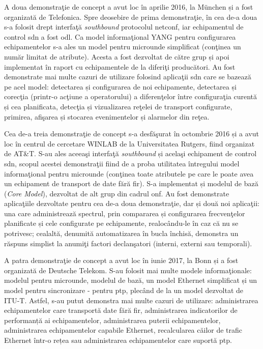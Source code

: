 A doua demonstraţie de concept a avut loc în aprilie 2016, la München și a fost organizată de Telefonica. Spre deosebire de prima demonstraţie, în cea de-a doua s-a folosit drept interfaţă \textit{southbound} protocolul \gls{netconf}, iar echipamentul de control \gls{sdn} a fost \gls{odl}. Ca model informaţional YANG pentru configurarea echipamentelor s-a ales un model pentru microunde simplificat (conţinea un număr limitat de atribute). Acesta a fost dezvoltat de către grup și apoi implementat în raport cu echipamentele de la diferiţi producători. Au fost demonstrate mai multe cazuri de utilizare folosind aplicaţii \gls{sdn} care se bazează pe acel model: detectarea și configurarea de noi echipamente, detectarea și corecţia (printr-o acţiune a operatorului) a diferenţelor între configuraţia curentă și cea planificata, detecţia și vizualizarea reţelei de transport configurate, primirea, afişarea și stocarea evenimentelor și alarmelor din reţea.

Cea de-a treia demonstraţie de concept s-a desfăşurat în octombrie 2016 și a avut loc în centrul de cercetare WINLAB de la Universitatea Rutgers, fiind organizat de AT\&T. S-au ales aceeaşi interfaţă \textit{southbound} și acelaşi echipament de control \gls{sdn}, scopul acestei demonstraţii fiind de a proba utilitatea întregului model informaţional pentru microunde (conţinea toate atributele pe care le poate avea un echipament de transport de date fără fir). S-a implementat și modelul de bază (\textit{Core Model}), dezvoltat de alt grup din cadrul \gls{onf}. Au fost demonstrate aplicaţiile dezvoltate pentru cea de-a doua demonstraţie, dar și două noi aplicaţii: una care administrează spectrul, prin compararea și configurarea frecvenţelor planificate și cele configurate pe echipamente, realocându-le în caz că nu se potrivesc; cealaltă, denumită automatizarea în bucla închisă, demonstra un răspuns simplist la anumiţi factori declanşatori (interni, externi sau temporali).

A patra demonstraţie de concept a avut loc în iunie 2017, la Bonn și a fost organizată de Deutsche Telekom. S-au folosit mai multe modele informaţionale: modelul pentru microunde, modelul de bază, un model Ethernet simplificat și un model pentru sincronizare - pentru \gls{ptp}, plecând de la un model dezvoltat de ITU-T. Astfel, s-au putut demonstra mai multe cazuri de utilizare: administrarea echipamentelor care transportă date fără fir, administrarea indicatorilor de performanță ai echipamentelor, administrarea puterii echipamentelor, administrarea echipamentelor capabile Ethernet, recalcularea căilor de trafic Ethernet într-o rețea sau administrarea echipamentelor care suportă \gls{ptp}. 

